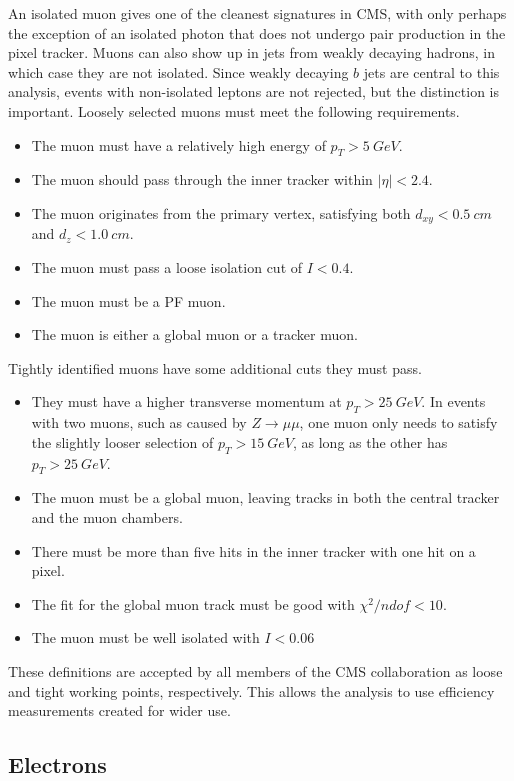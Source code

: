 An isolated muon gives one of the cleanest signatures in CMS,
with only perhaps the exception of an isolated photon that does not
undergo pair production in the pixel tracker.
Muons can also show up in jets from weakly decaying hadrons,
in which case they are not isolated.
Since weakly decaying $b$ jets are central to this analysis,
events with non-isolated leptons are not rejected,
but the distinction is important.
Loosely selected muons must meet the following requirements.
\begin{itemize}
\item The muon must have a relatively high energy of $p_T > \SI{5}{GeV}$.
\item The muon should pass through the inner tracker within $|\eta| < 2.4$.
\item The muon originates from the primary vertex, satisfying both
  $d_{xy} < \SI{0.5}{cm}$ and $d_z < \SI{1.0}{cm}$.
\item The muon must pass a loose isolation cut of $I < 0.4$.
\item The muon must be a PF muon.
\item The muon is either a global muon or a tracker muon.
\end{itemize}
Tightly identified muons have some additional cuts they must pass.
\begin{itemize}
\item They must have a higher transverse momentum at $p_T > \SI{25}{GeV}$.
  In events with two muons, such as caused by $Z \rightarrow \mu\mu$,
  one muon only needs to satisfy the slightly looser selection of $p_T > \SI{15}{GeV}$,
  as long as the other has $p_T > \SI{25}{GeV}$.
\item The muon must be a global muon, leaving tracks in both the central tracker
  and the muon chambers.
\item There must be more than five hits in the inner tracker with one hit on a pixel.
\item The fit for the global muon track must be good with $\chi^2/ndof < 10$.
\item The muon must be well isolated with $I < 0.06$
\end{itemize}

These definitions are accepted by all members of the CMS collaboration
as loose and tight working points, respectively.
This allows the analysis to use efficiency measurements created for wider use.

\subsection{Electrons} \label{sec:ele-def}

